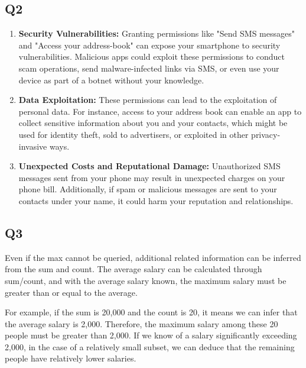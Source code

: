 \documentclass{article}
\begin{document}
\subsection{Q2}
	\begin{enumerate}
		\item \textbf{Security Vulnerabilities:} Granting permissions like "Send SMS messages" and "Access your address-book" can expose your smartphone to security vulnerabilities. Malicious apps could exploit these permissions to conduct scam operations, send malware-infected links via SMS, or even use your device as part of a botnet without your knowledge.

		\item \textbf{Data Exploitation:} These permissions can lead to the exploitation of personal data. For instance, access to your address book can enable an app to collect sensitive information about you and your contacts, which might be used for identity theft, sold to advertisers, or exploited in other privacy-invasive ways.

		\item \textbf{Unexpected Costs and Reputational Damage:} Unauthorized SMS messages sent from your phone may result in unexpected charges on your phone bill. Additionally, if spam or malicious messages are sent to your contacts under your name, it could harm your reputation and relationships.
	\end{enumerate}

\subsection{Q3}
	Even if the max cannot be queried, additional related information can be inferred from the sum and count. The average salary can be calculated through sum/count, and with the average salary known, the maximum salary must be greater than or equal to the average.

	For example, if the sum is 20,000 and the count is 20, it means we can infer that the average salary is 2,000. Therefore, the maximum salary among these 20 people must be greater than 2,000. If we know of a salary significantly exceeding 2,000, in the case of a relatively small subset, we can deduce that the remaining people have relatively lower salaries.


 
\end{document}
